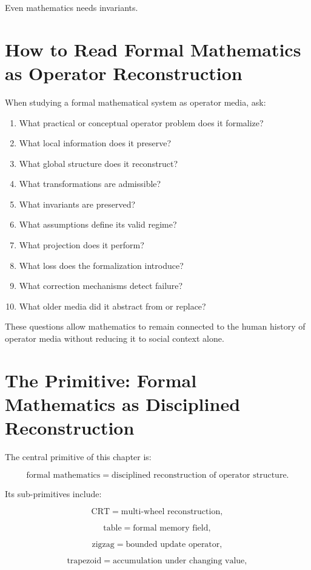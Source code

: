 \documentclass[11pt]{book}
\begin{document}
Even mathematics needs invariants.

\section{How to Read Formal Mathematics as Operator Reconstruction}

When studying a formal mathematical system as operator media, ask:

\begin{enumerate}[label=\arabic*.]
    \item What practical or conceptual operator problem does it formalize?
    \item What local information does it preserve?
    \item What global structure does it reconstruct?
    \item What transformations are admissible?
    \item What invariants are preserved?
    \item What assumptions define its valid regime?
    \item What projection does it perform?
    \item What loss does the formalization introduce?
    \item What correction mechanisms detect failure?
    \item What older media did it abstract from or replace?
\end{enumerate}

These questions allow mathematics to remain connected to the human history of operator media without reducing it to social context alone.

\section[The Primitive]{The Primitive: Formal Mathematics as Disciplined Reconstruction}

The central primitive of this chapter is:

\[
\text{formal mathematics} = \text{disciplined reconstruction of operator structure}.
\]

Its sub-primitives include:

\[
\text{CRT} = \text{multi-wheel reconstruction},
\]

\[
\text{table} = \text{formal memory field},
\]

\[
\text{zigzag} = \text{bounded update operator},
\]

\[
\text{trapezoid} = \text{accumulation under changing value},
\]
\end{document}
